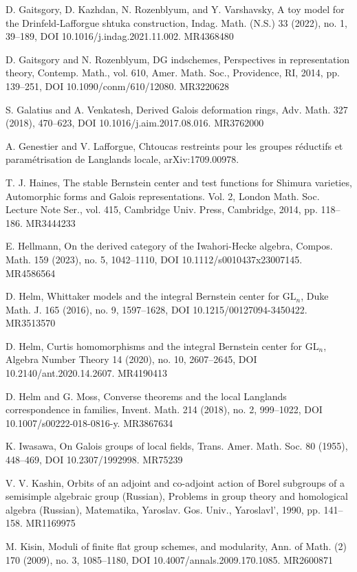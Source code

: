\begin{refs}
\item[{[33]}] D. Gaitsgory, D. Kazhdan, N. Rozenblyum, and Y. Varshavsky, A toy model for the Drinfeld-Lafforgue shtuka construction, Indag. Math. (N.S.) 33 (2022), no. 1, 39--189, DOI 10.1016/j.indag.2021.11.002. MR4368480
\item[{[34]}] D. Gaitsgory and N. Rozenblyum, DG indschemes, Perspectives in representation theory, Contemp. Math., vol. 610, Amer. Math. Soc., Providence, RI, 2014, pp. 139--251, DOI 10.1090/conm/610/12080. MR3220628
\item[{[35]}] S. Galatius and A. Venkatesh, Derived Galois deformation rings, Adv. Math. 327 (2018), 470--623, DOI 10.1016/j.aim.2017.08.016. MR3762000
\item[{[36]}] A. Genestier and V. Lafforgue, Chtoucas restreints pour les groupes r\'eductifs et param\'etrisation de Langlands locale, arXiv:1709.00978.
\item[{[37]}] T. J. Haines, The stable Bernstein center and test functions for Shimura varieties, Automorphic forms and Galois representations. Vol. 2, London Math. Soc. Lecture Note Ser., vol. 415, Cambridge Univ. Press, Cambridge, 2014, pp. 118--186. MR3444233
\item[{[38]}] E. Hellmann, On the derived category of the Iwahori-Hecke algebra, Compos. Math. 159 (2023), no. 5, 1042--1110, DOI 10.1112/s0010437x23007145. MR4586564
\item[{[39]}] D. Helm, Whittaker models and the integral Bernstein center for $\mathrm{GL}_n$, Duke Math. J. 165 (2016), no. 9, 1597--1628, DOI 10.1215/00127094-3450422. MR3513570
\item[{[40]}] D. Helm, Curtis homomorphisms and the integral Bernstein center for $\mathrm{GL}_n$, Algebra Number Theory 14 (2020), no. 10, 2607--2645, DOI 10.2140/ant.2020.14.2607. MR4190413
\item[{[41]}] D. Helm and G. Moss, Converse theorems and the local Langlands correspondence in families, Invent. Math. 214 (2018), no. 2, 999--1022, DOI 10.1007/s00222-018-0816-y. MR3867634
\item[{[42]}] K. Iwasawa, On Galois groups of local fields, Trans. Amer. Math. Soc. 80 (1955), 448--469, DOI 10.2307/1992998. MR75239
\item[{[43]}] V. V. Kashin, Orbits of an adjoint and co-adjoint action of Borel subgroups of a semisimple algebraic group (Russian), Problems in group theory and homological algebra (Russian), Matematika, Yaroslav. Gos. Univ., Yaroslavl', 1990, pp. 141--158. MR1169975
\item[{[44]}] M. Kisin, Moduli of finite flat group schemes, and modularity, Ann. of Math. (2) 170 (2009), no. 3, 1085--1180, DOI 10.4007/annals.2009.170.1085. MR2600871

\end{refs}
